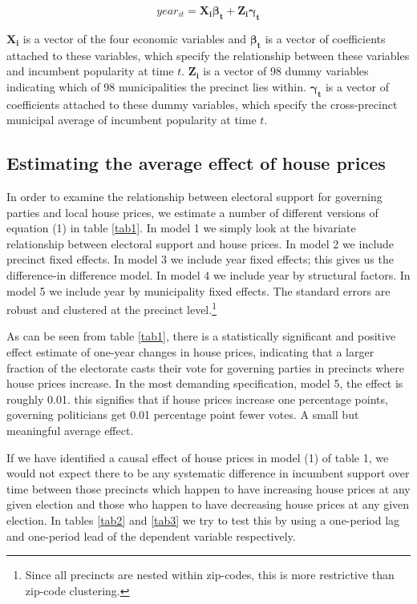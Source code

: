 \documentclass[12pt,a4paper]{article}
\begin{document}
\begin{equation}
year_{it}=\mathbf{X_i\beta_t + Z_i\gamma_t}
\end{equation}

$ \mathbf{X_i}$ is a vector of the four economic variables and $\mathbf{\beta_t}$ is a vector of coefficients attached to these variables, which specify the relationship between these variables and incumbent popularity at time $t$. $\mathbf{Z_i}$ is a vector of 98 dummy variables indicating which of 98 municipalities the precinct lies within. $\mathbf{\gamma_t}$ is a vector of coefficients attached to these dummy variables, which specify the cross-precinct municipal average of incumbent popularity at time $t$.


\subsection{Estimating the average effect of house prices}
In order to examine the relationship between electoral support for governing parties and local house prices, we estimate a number of different versions of equation (1) in table \ref{tab1}. In model 1 we simply look at the bivariate relationship between electoral support and house prices. In model 2 we include precinct fixed effects. In model 3 we include year fixed effects; this gives us the difference-in difference model. In model 4 we include year by structural factors. In model 5 we include year by municipality fixed effects. The standard errors are robust and clustered at the precinct level.\footnote{Since all precincts are nested within zip-codes, this is more restrictive than zip-code clustering.}

As can be seen from table \ref{tab1}, there is a statistically significant and positive effect estimate of one-year changes in house prices, indicating that a larger fraction of the electorate casts their vote for governing parties in precincts where house prices increase. In the most demanding specification, model 5, the effect is roughly 0.01. this signifies that if house prices increase one percentage points, governing politicians get 0.01 percentage point fewer votes. A small but meaningful average effect.




If we have identified a causal effect of house prices in model (1) of table 1, we would not expect there to be any systematic difference in incumbent support over time between those precincts which happen to have increasing house prices at any given election and those who happen to have decreasing house prices at any given election.  In tables \ref{tab2} and \ref{tab3} we try to test this by using a one-period lag and one-period lead of the dependent variable respectively.
\end{document}
